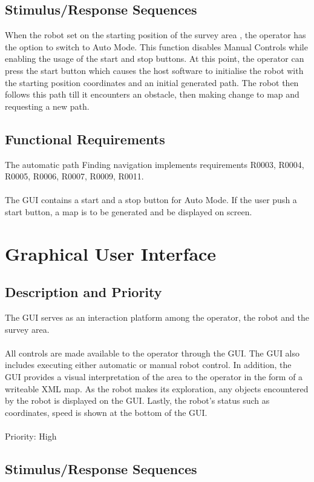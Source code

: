\documentclass[11pt, a4paper]{report}
\begin{document}
\subsection {Stimulus/Response Sequences}

When the robot set on the starting position of the survey area , the operator has the option to switch to Auto Mode. This function disables Manual Controls while enabling the usage of the start and stop buttons. At this point, the operator can press the start button which causes the host software to initialise the robot with the starting position coordinates and an initial generated path. The robot then follows this path till it encounters an obstacle, then making change to map and requesting a new path.

\subsection {Functional Requirements}
The automatic path Finding navigation implements requirements  R0003, R0004, R0005, R0006,
R0007, R0009, R0011.\\ \\
The GUI contains a start and a stop button for Auto Mode. If the user push a start button, a map is to be generated and be displayed on screen.


\section{Graphical User Interface}
\subsection {Description and Priority}
The GUI serves as an interaction platform among the operator, the robot and the survey area.\\ \\
All controls are made available to the operator through the GUI. The GUI also includes executing
either automatic or manual robot control. In addition, the GUI provides a visual interpretation of the area to the operator in the form of a writeable XML map. As the robot makes its exploration, any objects encountered by the robot is displayed on the GUI. Lastly, the robot's status such as coordinates, speed is shown at the bottom of the GUI.\\ \\
Priority: High


\subsection{Stimulus/Response Sequences}
\end{document}
